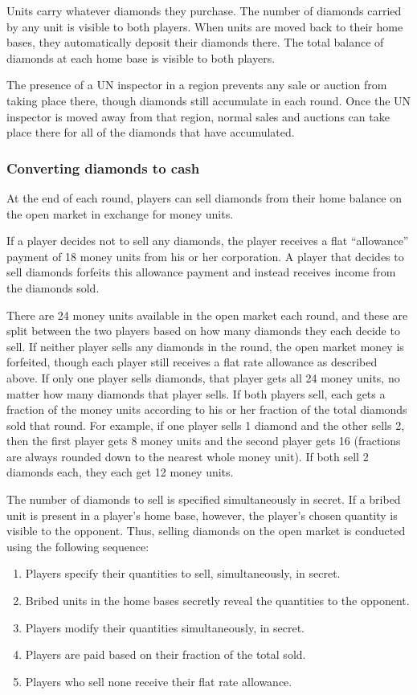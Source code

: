 \documentclass[12pt]{article}
\begin{document}
Units carry whatever diamonds they purchase.  The number of diamonds carried by any unit is visible to both players.  When units are moved back to their home bases, they automatically deposit their diamonds there.  The total balance of diamonds at each home base is visible to both players.

The presence of a UN inspector in a region prevents any sale or auction from taking place there, though diamonds still accumulate in each round.  Once the UN inspector is moved away from that region, normal sales and auctions can take place there for all of the diamonds that have accumulated.


\subsubsection{Converting diamonds to cash}
At the end of each round, players can sell diamonds from their home balance on the open market in exchange for money units.  

If a player decides not to sell any diamonds, the player receives a flat ``allowance'' payment of 18 money units from his or her corporation.  A player that decides to sell diamonds forfeits this allowance payment and instead receives income from the diamonds sold.

There are 24 money units available in the open market each round, and these are split between the two players based on how many diamonds they each decide to sell.  If neither player sells any diamonds in the round, the open market money is forfeited, though each player still receives a flat rate allowance as described above.  If only one player sells diamonds, that player gets all 24 money units, no matter how many diamonds that player sells.  If both players sell, each gets a fraction of the money units according to his or her fraction of the total diamonds sold that round.  For example, if one player sells 1 diamond and the other sells 2, then the first player gets 8 money units and the second player gets 16 (fractions are always rounded down to the nearest whole money unit).  If both sell 2 diamonds each, they each get 12 money units.  

The number of diamonds to sell is specified simultaneously in secret.  If a bribed unit is present in a player's home base, however, the player's chosen quantity is visible to the opponent.  Thus, selling diamonds on the open market is conducted using the following sequence: 
\begin{enumerate}
\item Players specify their quantities to sell, simultaneously, in secret.
\item Bribed units in the home bases secretly reveal the quantities to the opponent.
\item Players modify their quantities simultaneously, in secret.
\item Players are paid based on their fraction of the total sold.
\item Players who sell none receive their flat rate allowance.
\end{enumerate}
\end{document}
